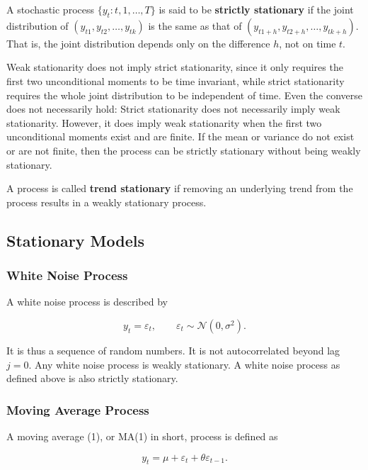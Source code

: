 A stochastic process $\{y_t:t,1,\dots,T\}$ is said to be \textbf{strictly stationary} if the joint distribution of $(y_{t1},y_{t2},\dots,y_{tk})$ is the same as that of $(y_{t1+h},y_{t2+h},\dots,y_{tk+h})$. That is, the joint distribution depends only on the difference $h$, not on time $t$. 

Weak stationarity does not imply strict stationarity, since it only requires the first two unconditional moments to be time invariant, while strict stationarity requires the whole joint distribution to be independent of time. Even the converse does not necessarily hold: Strict stationarity does not necessarily imply weak stationarity. However, it does imply weak stationarity when the first two unconditional moments exist and are finite. If the mean or variance do not exist or are not finite, then the process can be strictly stationary without being weakly stationary.

A process is called \textbf{trend stationary} if removing an underlying trend from the process results in a weakly stationary process. 

\subsection{Stationary Models}

\subsubsection{White Noise Process}

A white noise process is described by

\begin{equation}
  y_t = \varepsilon_t, \qquad \varepsilon_t \sim \mathcal{N}(0,\sigma^2).
\end{equation}

It is thus a sequence of random numbers. It is not autocorrelated beyond lag $j=0$. Any white noise process is weakly stationary. A white noise process as defined above is also strictly stationary.

\subsubsection{Moving Average Process}

A moving average (1), or MA(1) in short, process is defined as

\begin{equation}
  y_t = \mu + \varepsilon_t + \theta\varepsilon_{t-1}.
\end{equation}

